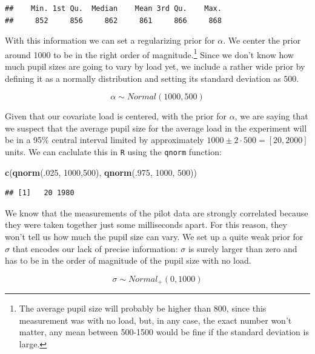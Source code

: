 \documentclass[12pt,]{krantz}
\newenvironment{Shaded}{\begin{snugshade}}{\end{snugshade}}
\newcommand{\DecValTok}[1]{\textcolor[rgb]{0.00,0.00,0.81}{#1}}
\newcommand{\KeywordTok}[1]{\textcolor[rgb]{0.13,0.29,0.53}{\textbf{#1}}}
\newcommand{\NormalTok}[1]{#1}
\theoremstyle{definition}
\theoremstyle{definition}
\theoremstyle{definition}
\theoremstyle{remark}
\begin{document}
\begin{verbatim}
##    Min. 1st Qu.  Median    Mean 3rd Qu.    Max. 
##     852     856     862     861     866     868
\end{verbatim}

With this information we can set a regularizing prior for \(\alpha\). We center the prior around 1000 to be in the right order of magnitude.\footnote{The average pupil size will probably be higher than 800, since this measurement was with no load, but, in any case, the exact number won't matter, any mean between 500-1500 would be fine if the standard deviation is large.} Since we don't know how much pupil sizes are going to vary by load yet, we include a rather wide prior by defining it as a normally distribution and setting its standard deviation as \(500\).

\begin{equation}
\alpha \sim Normal(1000, 500) 
\end{equation}

Given that our covariate load is centered, with the prior for \(\alpha\), we are saying that we suspect that the average pupil size for the average load in the experiment will be in a 95\% central interval limited by approximately \(1000 \pm 2 \cdot 500 = [20, 2000]\) units. We can caclulate this in \texttt{R} using the \texttt{qnorm} function:

\begin{Shaded}
\begin{Highlighting}[]
\KeywordTok{c}\NormalTok{(}\KeywordTok{qnorm}\NormalTok{(.}\DecValTok{025}\NormalTok{, }\DecValTok{1000}\NormalTok{,}\DecValTok{500}\NormalTok{), }\KeywordTok{qnorm}\NormalTok{(.}\DecValTok{975}\NormalTok{, }\DecValTok{1000}\NormalTok{, }\DecValTok{500}\NormalTok{))}
\end{Highlighting}
\end{Shaded}

\begin{verbatim}
## [1]   20 1980
\end{verbatim}

We know that the measurements of the pilot data are strongly correlated because they were taken together just some milliseconds apart. For this reason, they won't tell us how much the pupil size can vary. We set up a quite weak prior for \(\sigma\) that encodes our lack of precise information: \(\sigma\) is surely larger than zero and has to be in the order of magnitude of the pupil size with no load.

\begin{equation}
\sigma \sim Normal_+(0, 1000)
\end{equation}
\end{document}
